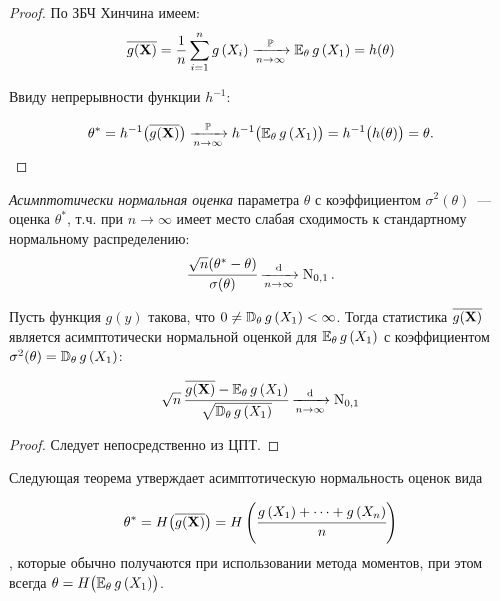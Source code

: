 \begin{proof}
    По ЗБЧ Хинчина имеем:
    \begin{equation*}
        \overline{g(\mathbf{X})} = 
        \frac{1}{n} \sum\limits_{i=1}^{n} g\left(X_{i}\right) 
        \xrightarrow[n \to \infty]{\operatorname{\mathbb{P}}} \operatorname{\operatorname{\mathbb{E}}_{\theta}} g\left(X_{1}\right) = 
        h(\theta)
    \end{equation*}

    Ввиду непрерывности функции $h^{-1}$:

    \begin{equation*}
        \theta^{*} = h^{-1}\bigl(\overline{g(\mathbf{X})}\bigr)
        \xrightarrow[n \to \infty]{\operatorname{\mathbb{P}}} h^{-1}\bigl(\operatorname{\operatorname{\mathbb{E}}_{\theta}} g\left(X_{1}\right)\bigr) =
        h^{-1}\bigl(h(\theta)\bigr) = \theta. \qedhere
    \end{equation*}
\end{proof}

\begin{defn}
    \textit{Асимптотически нормальная оценка} параметра $\theta$ с коэффициентом $\sigma^{2}(\theta)$~--- оценка $\theta^{*}$, т.ч. при $n \to \infty$ имеет место слабая сходимость к стандартному нормальному распределению: 
    \begin{equation*}
        \cfrac{\sqrt{n}(\theta^{*}-\theta)}{\sigma(\theta)} \xrightarrow[n \to \infty]{\text{d}} \operatorname{\mathrm{N}}_{0, 1}.
    \end{equation*}
\end{defn}

\begin{lem}
    Пусть функция $g(y)$ такова, что $0 \neq \operatorname{\mathbb{D}_{\theta}} g\left(X_{1}\right)<\infty$. 
    Тогда статистика $\overline{g(\mathbf{X})}$ является асимптотически нормальной оценкой для $\operatorname{\operatorname{\mathbb{E}}_{\theta}} g\left(X_{1}\right)$ с коэффициентом $\sigma^{2}(\theta)=\operatorname{\mathbb{D}_{\theta}} g\left(X_{1}\right)$:

    \begin{equation*}
        \sqrt{n} \, \cfrac{\overline{g(\mathbf{X})}-\operatorname{\operatorname{\mathbb{E}}_{\theta}} g\left(X_{1}\right)}{\sqrt{\operatorname{\mathbb{D}_{\theta}} g\left(X_{1}\right)}} 
        \xrightarrow[n \to \infty]{\text{d}} \operatorname{\mathrm{N}}_{0, 1}
    \end{equation*}
\end{lem}

\begin{proof}
    Следует непосредственно из ЦПТ.
\end{proof}

\begin{rmrk}
    Следующая теорема утверждает асимптотическую нормальность оценок вида

    \begin{equation*}
        \theta^{*} = 
        H \bigl( \overline{g(\mathbf{X})} \bigr) = 
        H\left(\cfrac{g\left(X_{1}\right)+\cdots+g\left(X_{n}\right)}{n}\right)
    \end{equation*}
    , которые обычно получаются при использовании метода моментов, при этом всегда $\theta = H \bigl(\operatorname{\operatorname{\mathbb{E}}_{\theta}} g\left(X_{1}\right) \bigr)$.
\end{rmrk}

